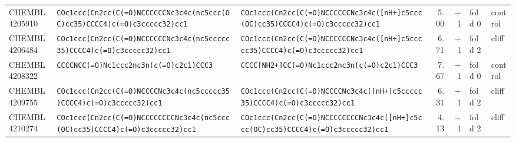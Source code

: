 \begin{longtable}{l p{4.4cm} p{4.4cm} r r l l}
CHEMBL4205910 & \texttt{COc1ccc(\allowbreak{}Cn2cc(\allowbreak{}C(\allowbreak{}=\allowbreak{}O)\allowbreak{}NCCCCCCNc3c4c(\allowbreak{}nc5ccc(\allowbreak{}OC)\allowbreak{}cc35)\allowbreak{}CCCC4)\allowbreak{}c(\allowbreak{}=\allowbreak{}O)\allowbreak{}c3ccccc32)\allowbreak{}cc1} & \texttt{COc1ccc(\allowbreak{}Cn2cc(\allowbreak{}C(\allowbreak{}=\allowbreak{}O)\allowbreak{}NCCCCCCNc3c4c(\allowbreak{}[nH+]\allowbreak{}c5ccc(\allowbreak{}OC)\allowbreak{}cc35)\allowbreak{}CCCC4)\allowbreak{}c(\allowbreak{}=\allowbreak{}O)\allowbreak{}c3ccccc32)\allowbreak{}cc1} & 5.00 & +1 & fold 0 & control \\
CHEMBL4206484 & \texttt{COc1ccc(\allowbreak{}Cn2cc(\allowbreak{}C(\allowbreak{}=\allowbreak{}O)\allowbreak{}NCCCCCCNc3c4c(\allowbreak{}nc5ccccc35)\allowbreak{}CCCC4)\allowbreak{}c(\allowbreak{}=\allowbreak{}O)\allowbreak{}c3ccccc32)\allowbreak{}cc1} & \texttt{COc1ccc(\allowbreak{}Cn2cc(\allowbreak{}C(\allowbreak{}=\allowbreak{}O)\allowbreak{}NCCCCCCNc3c4c(\allowbreak{}[nH+]\allowbreak{}c5ccccc35)\allowbreak{}CCCC4)\allowbreak{}c(\allowbreak{}=\allowbreak{}O)\allowbreak{}c3ccccc32)\allowbreak{}cc1} & 6.71 & +1 & fold 2 & cliff \\
CHEMBL4208322 & \texttt{CCCCNCC(\allowbreak{}=\allowbreak{}O)\allowbreak{}Nc1ccc2nc3n(\allowbreak{}c(\allowbreak{}=\allowbreak{}O)\allowbreak{}c2c1)\allowbreak{}CCC3} & \texttt{CCCC[NH2+]\allowbreak{}CC(\allowbreak{}=\allowbreak{}O)\allowbreak{}Nc1ccc2nc3n(\allowbreak{}c(\allowbreak{}=\allowbreak{}O)\allowbreak{}c2c1)\allowbreak{}CCC3} & 7.67 & +1 & fold 0 & control \\
CHEMBL4209755 & \texttt{COc1ccc(\allowbreak{}Cn2cc(\allowbreak{}C(\allowbreak{}=\allowbreak{}O)\allowbreak{}NCCCCNc3c4c(\allowbreak{}nc5ccccc35)\allowbreak{}CCCC4)\allowbreak{}c(\allowbreak{}=\allowbreak{}O)\allowbreak{}c3ccccc32)\allowbreak{}cc1} & \texttt{COc1ccc(\allowbreak{}Cn2cc(\allowbreak{}C(\allowbreak{}=\allowbreak{}O)\allowbreak{}NCCCCNc3c4c(\allowbreak{}[nH+]\allowbreak{}c5ccccc35)\allowbreak{}CCCC4)\allowbreak{}c(\allowbreak{}=\allowbreak{}O)\allowbreak{}c3ccccc32)\allowbreak{}cc1} & 6.31 & +1 & fold 2 & cliff \\
CHEMBL4210274 & \texttt{COc1ccc(\allowbreak{}Cn2cc(\allowbreak{}C(\allowbreak{}=\allowbreak{}O)\allowbreak{}NCCCCCCCCNc3c4c(\allowbreak{}nc5ccc(\allowbreak{}OC)\allowbreak{}cc35)\allowbreak{}CCCC4)\allowbreak{}c(\allowbreak{}=\allowbreak{}O)\allowbreak{}c3ccccc32)\allowbreak{}cc1} & \texttt{COc1ccc(\allowbreak{}Cn2cc(\allowbreak{}C(\allowbreak{}=\allowbreak{}O)\allowbreak{}NCCCCCCCCNc3c4c(\allowbreak{}[nH+]\allowbreak{}c5ccc(\allowbreak{}OC)\allowbreak{}cc35)\allowbreak{}CCCC4)\allowbreak{}c(\allowbreak{}=\allowbreak{}O)\allowbreak{}c3ccccc32)\allowbreak{}cc1} & 4.13 & +1 & fold 2 & cliff \\

\end{longtable}
